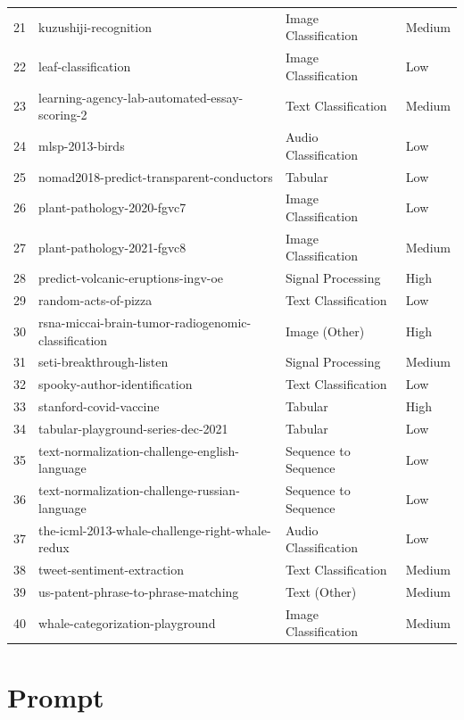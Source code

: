 \begin{table}[htbp]
\begin{tabular}{p{0.6cm} p{6cm} p{3cm} p{1.6cm}}
21 & kuzushiji-recognition & Image Classification & Medium \\
22 & leaf-classification & Image Classification & Low \\
23 & learning-agency-lab-automated-essay-scoring-2 & Text Classification & Medium \\
24 & mlsp-2013-birds & Audio Classification & Low \\
25 & nomad2018-predict-transparent-conductors & Tabular & Low \\
26 & plant-pathology-2020-fgvc7 & Image Classification & Low \\
27 & plant-pathology-2021-fgvc8 & Image Classification & Medium \\
28 & predict-volcanic-eruptions-ingv-oe & Signal Processing & High \\
29 & random-acts-of-pizza & Text Classification & Low \\
30 & rsna-miccai-brain-tumor-radiogenomic-classification & Image (Other) & High \\
31 & seti-breakthrough-listen & Signal Processing & Medium \\
32 & spooky-author-identification & Text Classification & Low \\
33 & stanford-covid-vaccine & Tabular & High \\
34 & tabular-playground-series-dec-2021 & Tabular & Low \\
35 & text-normalization-challenge-english-language & Sequence to Sequence & Low \\
36 & text-normalization-challenge-russian-language & Sequence to Sequence & Low \\
37 & the-icml-2013-whale-challenge-right-whale-redux & Audio Classification & Low \\
38 & tweet-sentiment-extraction & Text Classification & Medium \\
39 & us-patent-phrase-to-phrase-matching & Text (Other) & Medium \\
40 & whale-categorization-playground & Image Classification & Medium \\
\bottomrule
\end{tabular} 
\end{table}


\section{Prompt}
\label{app:prompts}


